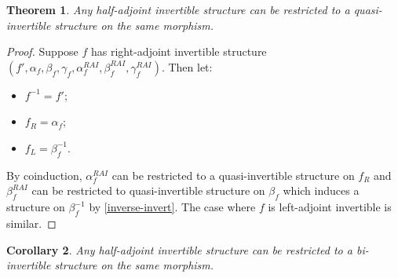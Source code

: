 \documentclass[draft]{article}
\newtheorem{theorem}{Theorem} \newtheorem{prop}[theorem]{Proposition}
\newtheorem{cor}[theorem]{Corollary}
\newcommand{\inv}[1]{#1^{-1}} \newcommand{\comp}{\star}
\begin{document}
\begin{theorem}
  Any half-adjoint invertible structure can be restricted to a
  quasi-invertible structure on the same morphism.
\end{theorem}
\begin{proof}
  Suppose \(f\) has right-adjoint invertible structure \((f',
  \alpha_f, \beta_f, \gamma_f, \alpha_f^{RAI}, \beta_f^{RAI},
  \gamma_f^{RAI})\). Then let:
  \begin{itemize}
  \item \(\inv f = {f'}\);
  \item \(f_R = \alpha_f\);
  \item \(f_L = \beta_f^{-1}\).
  \end{itemize}
  By coinduction, \(\alpha_f^{RAI}\) can be restricted to a
  quasi-invertible structure on \(f_R\) and \(\beta_f^{RAI}\) can be
  restricted to quasi-invertible structure on \(\beta_f\) which
  induces a structure on \(\inv {\beta_f}\) by \cref{inverse-invert}.
  The case where \(f\) is left-adjoint invertible is similar.
\end{proof}

\begin{cor}
  Any half-adjoint invertible structure can be restricted to a
  bi-invertible structure on the same morphism.
\end{cor}
\end{document}
